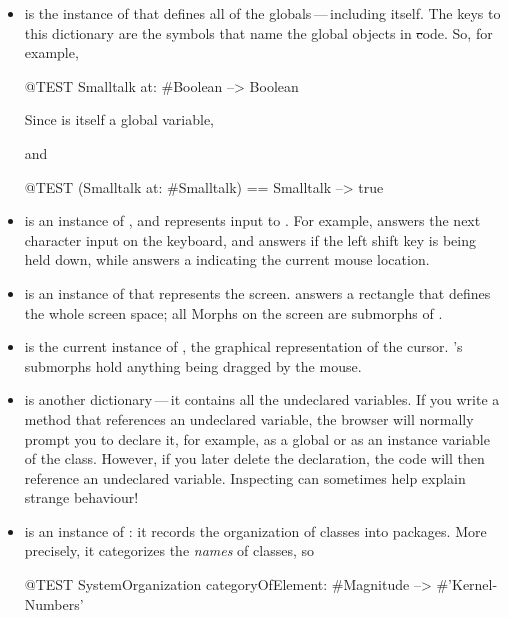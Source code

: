 \documentclass[a4paper,10pt,twoside]{book}
\begin{document}
\begin{itemize}
\item
{} is the instance of  that defines all of the globals\,---\,including  itself.   
The keys to this dictionary are the symbols that name the global objects in \st code.
So, for example,
\begin{code}{@TEST}
Smalltalk at: #Boolean --> Boolean
\end{code}
Since  is itself a global variable,
\begin{code}{}
Smalltalk at: #Smalltalk-->a SystemDictionary(lots of globals)}
\end{code} 
and
\begin{code}{@TEST}
(Smalltalk at: #Smalltalk) == Smalltalk --> true
\end{code}

\item {} is an instance of , and represents input to \pharo.
For example,  answers the next character input on the keyboard, and  answers  if the left shift key is being held down, while  answers a  indicating the current mouse location.

\item {} is an instance of  that represents the screen.
 answers a rectangle that defines the whole screen space; all Morphs on the screen are submorphs of .

\item 
{} is the current instance of , the graphical representation of the cursor.  's submorphs hold anything being dragged by the mouse.

\item
{} is another dictionary\,---\,it contains all the undeclared variables.
If you write a method that references an undeclared variable, the browser will normally
prompt you to declare it, for example, as a global or as an instance variable of the class.
However, if you later delete the declaration, the code will then reference an undeclared variable.
Inspecting  can sometimes help explain strange behaviour!

\item
{} is an instance of : it records the organization of classes into packages.  More precisely, it categorizes the \emph{names} of classes, so
\begin{code}{@TEST}
SystemOrganization categoryOfElement: #Magnitude --> #'Kernel-Numbers'
\end{code}

\end{itemize}
\end{document}
